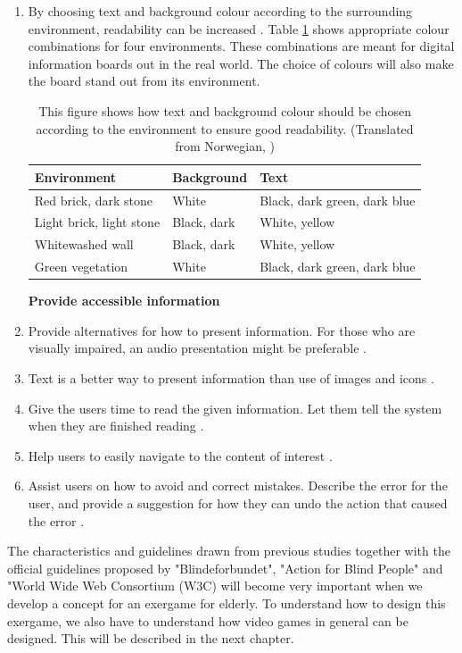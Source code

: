 \begin{enumerate}[{g}.1]
\item By choosing text and background colour according to the surrounding environment, readability can be increased \cite{blindeforbundetTekst}. Table \ref{tab:contrastenvironment} shows appropriate colour combinations for four environments. These combinations are meant for digital information boards out in the real world. The choice of colours will also make the board stand out from its environment.  

\begin{table} [ht!]
\centering
    \begin{tabular}{|p{}|p{}|p{}|}
       \hline
       \textbf{Environment} & \textbf{Background} & \textbf{Text} \\ \hline
		Red brick, dark stone & White & Black, dark green, dark blue \\ \hline
		Light brick, light stone & Black, dark & White, yellow \\ \hline
		Whitewashed wall & Black, dark & White, yellow \\ \hline
		Green vegetation & White & Black, dark green, dark blue \\ \hline
    \end{tabular}
    \caption[Colours and contrasts - environment]{This figure shows how text and background colour should be chosen according to the environment to ensure good readability. (Translated from Norwegian, \cite{blindeforbundetTekst})}
    \label{tab:contrastenvironment}
\end{table} 


\textbf{Provide accessible information}
\item Provide alternatives for how to present information. For those who are visually impaired, an audio presentation might be preferable \cite{blindeforbundetTekst} \cite{w3cTekst}. 
\item Text is a better way to present information than use of images and icons \cite{w3cTekst}.
\item Give the users time to read the given information. Let them tell the system when they are finished reading \cite{w3cTekst}.  
\item Help users to easily navigate to the content of interest \cite{w3cTekst}.
\item Assist users on how to avoid and correct mistakes. Describe the error for the user, and provide a suggestion for how they can undo the action that caused the error \cite{w3cTekst}.      
\end{enumerate} 

The characteristics and guidelines drawn from previous studies together with the official guidelines proposed by "Blindeforbundet", "Action for Blind People" and "World Wide Web Consortium (W3C) will become very important  when we develop a concept for an exergame for elderly. To understand how to design this exergame, we also have to understand how video games in general can be designed. This will be described in the next chapter.




